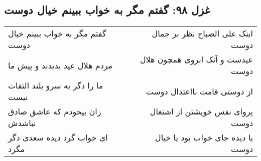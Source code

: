 \begin{center}
\section*{غزل ۹۸: گفتم مگر به خواب ببینم خیال دوست}
\label{sec:098}
\begin{longtable}{l p{0.5cm} r}
گفتم مگر به خواب ببینم خیال دوست
&&
اینک علی الصباح نظر بر جمال دوست
\\
مردم هلال عید بدیدند و پیش ما
&&
عیدست و آنک ابروی همچون هلال دوست
\\
ما را دگر به سرو بلند التفات نیست
&&
از دوستی قامت بااعتدال دوست
\\
زان بیخودم که عاشق صادق نباشدش
&&
پروای نفس خویشتن از اشتغال دوست
\\
ای خواب گرد دیده سعدی دگر مگرد
&&
یا دیده جای خواب بود یا خیال دوست
\\
\end{longtable}
\end{center}
